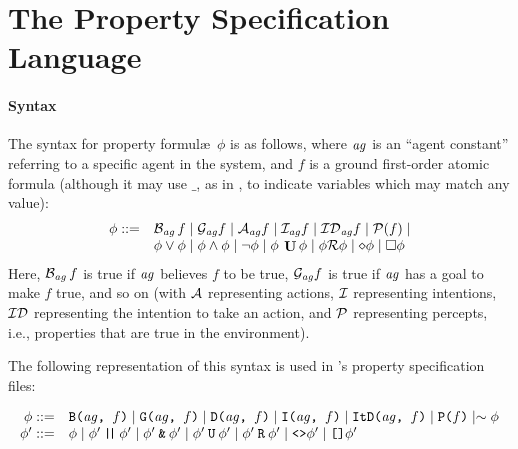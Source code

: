 \section{The Property Specification Language}

\paragraph{Syntax}
The syntax for property formul\ae\ $\phi$ is as follows, where
$\mathit{ag}$ is an ``agent constant'' referring to a specific agent in
the system, and $f$ is a ground first-order atomic formula (although it may use $\_$, as in \prolog, to indicate variables which may match any value):
%
\begin{equation*}
\begin{array}{rl}
\phi ::= & \mathrm{{\cal B}}_{\mathit{ag}} \, f \mid \mathrm{{\cal G}}_{\mathit{ag}} f \mid
  \mathrm{{\cal A}}_{\mathit{ag}} f \mid \mathrm{{\cal I}}_{\mathit{ag}} f \mid
  \mathrm{{\cal ID}}_{\mathit{ag}} f \mid
  \mathrm{{\cal P}}(f) \mid \\ &
  \phi \vee \phi \mid \phi \wedge \phi \mid \neg \phi
   \mid \phi \: \mathop{\mathrm{\mathbf{U}}} \phi \mid \phi \mathcal{R} \phi \mid \diamond \phi \mid \Box \phi
\end{array}
\end{equation*}
%
Here, $\mathrm{{\cal B}}_{\mathit{ag}} \, f$ is true if $\mathit{ag}$ believes
$f$ to be true, $\mathrm{{\cal G}}_{\mathit{ag}} f$ is true if $\mathit{ag}$ has a
goal to make $f$ true, and so on (with $\mathrm{{\cal A}}$ representing
actions, $\mathrm{{\cal I}}$ representing intentions, $\mathrm{{\cal ID}}$ representing the intention to take an action, and $\mathrm{{\cal P}}$
representing percepts, i.e., properties that are true in the environment).

The following representation of this syntax is used in \ajpf's property specification files:

\begin{equation*}
\begin{array}{rl}
\phi ::= & \texttt{B(}\mathit{ag}\texttt{, }f\texttt{)} \mid 
\texttt{G(}\mathit{ag}\texttt{, }f\texttt{)} \mid 
\texttt{D(}\mathit{ag}\texttt{, }f\texttt{)} \mid 
\texttt{I(}\mathit{ag}\texttt{, }f\texttt{)} \mid 
\texttt{ItD(}\mathit{ag}\texttt{, }f\texttt{)} \mid 
\texttt{P(}f\texttt{)} \mid \sim \phi \\
\phi' ::= & \phi \mid 
  \phi' \: \texttt{|\!|} \: \phi' \mid 
  \phi' \: \texttt{\&} \: \phi' \mid 
   \phi' \: \texttt{U} \: \phi' \mid \phi' \: \texttt{R} \: \phi' \mid \texttt{<>} \phi' \mid \texttt{[]} \phi'
\end{array}
\end{equation*}


